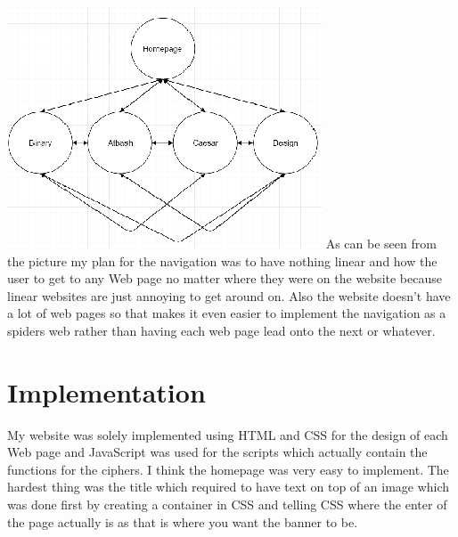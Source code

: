 \documentclass[10pt, a4paper]{article}
\begin{document}
\includegraphics{nav.png}
As can be seen from the picture my plan for the navigation was to have nothing linear and how the user to get to any Web page no matter where they were on the website because linear websites are just annoying to get around on. Also the website doesn't have a lot of web pages so that makes it even easier to implement the navigation as a spiders web rather than having each web page lead onto the next or whatever.


\section{Implementation}
My website was solely implemented using HTML and CSS for the design of each Web page and JavaScript was used for the scripts which actually contain the functions for the ciphers. I think the homepage was very easy to implement. The hardest thing was the title which required to have text on top of an image which was done first by creating a container in CSS and telling CSS where the enter of the page actually is as that is where you want the banner to be.
\end{document}
